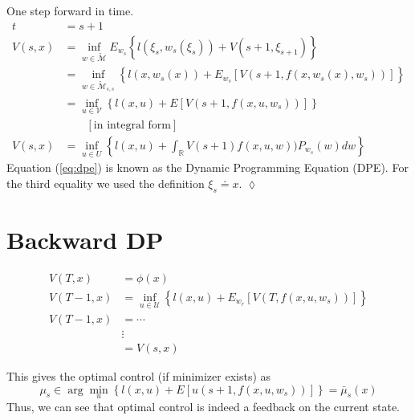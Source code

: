 \begin{example}
One step forward in time.
\begin{align}
\label{eq:dpe}
t &= s+1 \nonumber \\
V(s,x) &= \inf_{w\in\tilde{\mathcal{M}}} E_{w_s}\left\lbrace l(\xi_s,w_s(\xi_s)) + V(s+1,\xi_{s+1})\right\rbrace \nonumber \\
&= \inf_{w\in\tilde{\mathcal{M}}_{s,s}} \left\lbrace l(x,w_s(x)) + E_{w_s}[V(s+1,f(x,w_s(x),w_s))]\right\rbrace \nonumber \\
&= \inf_{u\in\mathcal{V}} \left\lbrace l(x,u) + E[V(s+1,f(x,u,w_s))]\right\rbrace \nonumber \\
&\qquad [\text{in~integral~form}] \nonumber \\
V(s,x) &= \inf_{u\in U} \left\lbrace l(x,u) + \int_{\mathbb{R}}V(s+1)f(x,u,w))P_{w_s}(w)dw\right\rbrace
\end{align}
Equation (\ref{eq:dpe}) is known as the Dynamic Programming Equation (DPE).
For the third equality we used the definition $\xi_s \doteq x$.
$\lozenge$
\end{example}

\section{Backward DP}
\begin{align*}
V(T,x) &= \phi(x) \\
V(T-1,x) &= \inf_{u\in\mathcal{U}} \left\lbrace l(x,u) + E_{w_r}[V(T,f(x,u,w_s))]\right\rbrace \\
V(T-1,x) &= \cdots \\
&\vdots \\
&= V(s,x)
\end{align*}

This gives the optimal control (if minimizer exists) as
$$\mu_s \in \arg\min_{u} \left\lbrace l(x,u) + E[u(s+1,f(x,u,w_s))]\right\rbrace = \bar{\mu}_s(x)$$
Thus, we can see that optimal control is indeed a feedback on the current state.%
